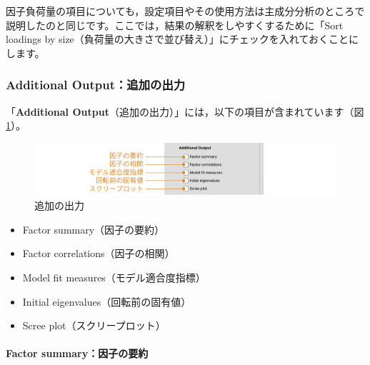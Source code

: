 \documentclass[
  12pt,
  a5jpaper,
  lualatex, ja=standard]{bxjsbook}
\providecommand{\tightlist}{%
  \setlength{\itemsep}{0pt}\setlength{\parskip}{0pt}}
\newenvironment{jmvsettings}{%
	\begin{center}%
	\begin{tcolorbox}[%
		title=設定項目,
		colframe=gmoji,
		colbacktitle=gmoji,
		colback=gmoji!2!white,
		breakable,
		width=.9\textwidth,
		]\small\addtolength{\leftmargini}{-3\labelsep}%
	}%
	{\end{tcolorbox}\end{center}}
\begin{document}
因子負荷量の項目についても，設定項目やその使用方法は主成分分析のところで説明したのと同じです。ここでは，結果の解釈をしやすくするために「Sort loadings by size（負荷量の大きさで並び替え）」にチェックを入れておくことにします。

\hypertarget{sub:factor-efa-additional-output}{%
\subsubsection*{Additional Output：追加の出力}\label{sub:factor-efa-additional-output}}

「\textbf{Additional Output}（追加の出力）」には，以下の項目が含まれています（図\ref{fig:factor-efa-additional-output}）。

\begin{figure}[!ht]

{\centering \includegraphics[width=1\linewidth]{images/factor/efa-additional-output} 

}

\caption{追加の出力}\label{fig:factor-efa-additional-output}
\end{figure}

\begin{jmvsettings}

\begin{itemize}
\tightlist
\item
  Factor summary（因子の要約）
\item
  Factor correlations（因子の相関）
\item
  Model fit measures（モデル適合度指標）
\item
  Initial eigenvalues（回転前の固有値）
\item
  Scree plot（スクリープロット）
\end{itemize}

\end{jmvsettings}

\hypertarget{subsub:factor-efa-factor-summary}{%
\paragraph*{Factor summary：因子の要約}\label{subsub:factor-efa-factor-summary}}
\end{document}
